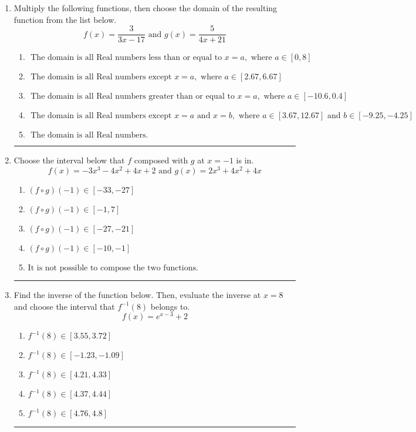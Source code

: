 \documentclass[14pt]{extbook}
\newcommand{\litem}[1]{\item#1\hspace*{-1cm}\rule{\textwidth}{0.4pt}}
\begin{document}
\begin{enumerate}
{\begin{enumerate}[label=\Alph*.]
\end{enumerate} }
\litem{
Multiply the following functions, then choose the domain of the resulting function from the list below.\[ f(x) = \frac{3}{3x-17} \text{ and } g(x) = \frac{5}{4x+21} \]\begin{enumerate}[label=\Alph*.]
\item \( \text{ The domain is all Real numbers less than or equal to } x = a, \text{ where } a \in [0, 8] \)
\item \( \text{ The domain is all Real numbers except } x = a, \text{ where } a \in [2.67, 6.67] \)
\item \( \text{ The domain is all Real numbers greater than or equal to } x = a, \text{ where } a \in [-10.6, 0.4] \)
\item \( \text{ The domain is all Real numbers except } x = a \text{ and } x = b, \text{ where } a \in [3.67, 12.67] \text{ and } b \in [-9.25, -4.25] \)
\item \( \text{ The domain is all Real numbers. } \)

\end{enumerate} }
\litem{
Choose the interval below that $f$ composed with $g$ at $x=-1$ is in.\[ f(x) = -3x^{3} -4 x^{2} +4 x + 2 \text{ and } g(x) = 2x^{3} +4 x^{2} +4 x \]\begin{enumerate}[label=\Alph*.]
\item \( (f \circ g)(-1) \in [-33, -27] \)
\item \( (f \circ g)(-1) \in [-1, 7] \)
\item \( (f \circ g)(-1) \in [-27, -21] \)
\item \( (f \circ g)(-1) \in [-10, -1] \)
\item \( \text{It is not possible to compose the two functions.} \)

\end{enumerate} }
\litem{
Find the inverse of the function below. Then, evaluate the inverse at $x = 8$ and choose the interval that $f^{-1}(8)$ belongs to.\[ f(x) = e^{x-3}+2 \]\begin{enumerate}[label=\Alph*.]
\item \( f^{-1}(8) \in [3.55, 3.72] \)
\item \( f^{-1}(8) \in [-1.23, -1.09] \)
\item \( f^{-1}(8) \in [4.21, 4.33] \)
\item \( f^{-1}(8) \in [4.37, 4.44] \)
\item \( f^{-1}(8) \in [4.76, 4.8] \)

\end{enumerate} }
\end{enumerate}
\end{document}

